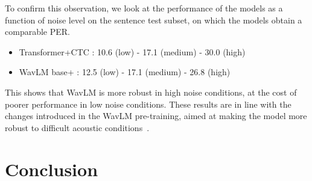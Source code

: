 \documentclass{Interspeech2024}
\begin{document}
To confirm this observation, we look at the performance of the models as a function of noise level on the sentence test subset, on which the models obtain a comparable PER.
\begin{itemize}
    \item Transformer+CTC : 10.6 (low) - 17.1 (medium) - 30.0 (high)
    \item WavLM base+ \hspace{14pt} : 12.5 (low) - 17.1 (medium) - 26.8 (high)
\end{itemize}
This shows that WavLM is more robust in high noise conditions, at the cost of poorer performance in low noise conditions. These results are in line with the changes introduced in the WavLM pre-training, aimed at making the model more robust to difficult acoustic conditions~\cite{Chen2022-wavlm}.

\vspace{-0.2cm}
\section{Conclusion}
\end{document}
